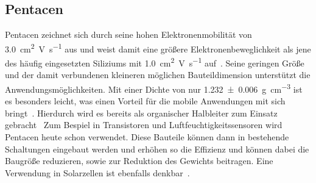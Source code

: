         \subsection{Pentacen} \label{sec:5A}
            Pentacen zeichnet sich durch seine hohen Elektronenmobilität von \SI{3.0}{\centi\meter\squared\volt\per\second} aus und weist damit eine größere Elektronenbeweglichkeit als jene des häufig eingesetzten Siliziums mit \SI{1.0}{\centi\meter\squared\volt\per\second} auf~\cite{5A_13}.
            Seine geringen Größe und der damit verbundenen kleineren möglichen Bauteildimension unterstützt die Anwendungsmöglichkeiten.
            Mit einer Dichte von nur \SI{1.232(6)}{\gram\per\cubic\centi\meter} ist es besonders leicht, was einen Vorteil für die mobile Anwendungen mit sich bringt~\cite{CAS}.
            Hierdurch wird es bereits als organischer Halbleiter zum Einsatz gebracht~\cite{5A_4}
            Zum Bespiel in Transistoren \cite{5A_14, 5A_13} und Luftfeuchtigkeitssensoren \cite{demelas_chemical_2015} wird Pentacen heute schon verwendet.
            Diese Bauteile können dann in bestehende Schaltungen eingebaut werden und erhöhen so die Effizienz und können dabei die Baugröße reduzieren, sowie zur Reduktion des Gewichts beitragen.
            Eine Verwendung in Solarzellen ist ebenfalls denkbar~\cite{shirota_1_2019}.
  
